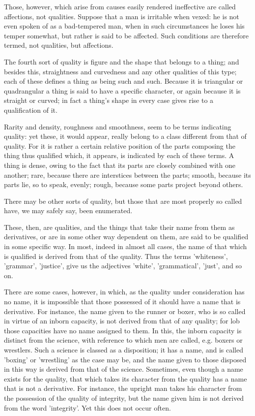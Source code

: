 Those, however, which arise from causes easily rendered ineffective are
called affections, not qualities. Suppose that a man is irritable when
vexed: he is not even spoken of as a bad-tempered man, when in such
circumstances he loses his temper somewhat, but rather is said to be
affected. Such conditions are therefore termed, not qualities, but
affections.

The fourth sort of quality is figure and the shape that belongs to a
thing; and besides this, straightness and curvedness and any other
qualities of this type; each of these defines a thing as being such and
such. Because it is triangular or quadrangular a thing is said to have
a specific character, or again because it is straight or curved; in
fact a thing's shape in every case gives rise to a qualification of it.

Rarity and density, roughness and smoothness, seem to be terms
indicating quality: yet these, it would appear, really belong to a
class different from that of quality. For it is rather a certain
relative position of the parts composing the thing thus qualified
which, it appears, is indicated by each of these terms. A thing is
dense, owing to the fact that its parts are closely combined with one
another; rare, because there are interstices between the parts; smooth,
because its parts lie, so to speak, evenly; rough, because some parts
project beyond others.

There may be other sorts of quality, but those that are most properly
so called have, we may safely say, been enumerated.

These, then, are qualities, and the things that take their name from
them as derivatives, or are in some other way dependent on them, are
said to be qualified in some specific way. In most, indeed in almost
all cases, the name of that which is qualified is derived from that of
the quality. Thus the terms 'whiteness', 'grammar', 'justice', give us
the adjectives 'white', 'grammatical', 'just', and so on.

There are some cases, however, in which, as the quality under
consideration has no name, it is impossible that those possessed of it
should have a name that is derivative. For instance, the name given to
the runner or boxer, who is so called in virtue of an inborn capacity,
is not derived from that of any quality; for lob those capacities have
no name assigned to them. In this, the inborn capacity is distinct from
the science, with reference to which men are called, e.g. boxers or
wrestlers. Such a science is classed as a disposition; it has a name,
and is called 'boxing' or 'wrestling' as the case may be, and the name
given to those disposed in this way is derived from that of the
science. Sometimes, even though a name exists for the quality, that
which takes its character from the quality has a name that is not a
derivative. For instance, the upright man takes his character from the
possession of the quality of integrity, but the name given him is not
derived from the word 'integrity'. Yet this does not occur often.

